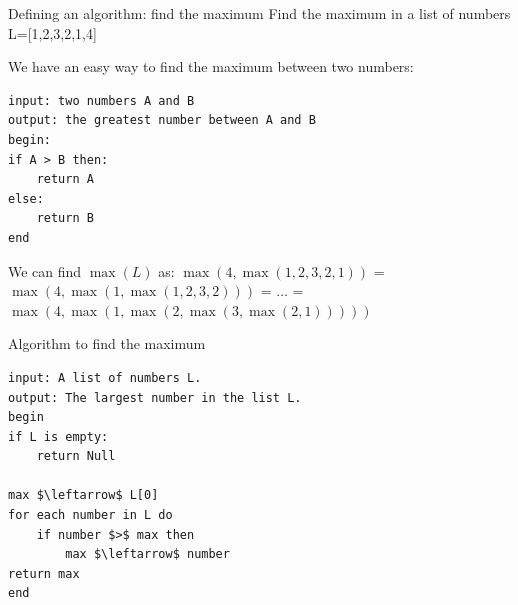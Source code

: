 \documentclass[aspectratio=169,]{beamer}
\begin{document}
\begin{frame}[fragile]{Defining an algorithm: find the maximum}
    Find the maximum in a list of numbers L=[1,2,3,2,1,4]

    \pause
    We have an easy way to find the maximum between two numbers:
    \begin{lstlisting}[style=pseudo, linewidth=7cm]
input: two numbers A and B
output: the greatest number between A and B
begin:
if A > B then:
    return A
else:
    return B
end
    \end{lstlisting}
    \pause
    We can find $\max(L)$ as: $\max(4, \max(1,2,3,2,1))$ = $\max(4, \max(1, \max(1,2,3,2)))$ = $\dots$
    = $\max(4, \max(1, \max(2, \max(3, \max(2, 1)))))$
\end{frame}

\begin{frame}[fragile]{Algorithm to find the maximum}
    \begin{minipage}{0.49\textwidth}
        \begin{lstlisting}[style=pseudo, linewidth=7cm]
input: A list of numbers L.
output: The largest number in the list L.
begin
if L is empty:
    return Null

max $\leftarrow$ L[0]
for each number in L do
    if number $>$ max then
        max $\leftarrow$ number
return max
end
        \end{lstlisting}
    \end{minipage}
    \begin{minipage}{0.49\textwidth}
        \centering
\end{minipage}
\end{frame}
\end{document}
